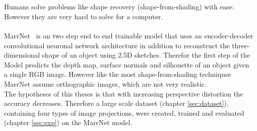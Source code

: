 	\\
	\\
	Humans solve problems like shape recovery (shape-from-shading) with ease. However they are very hard to solve for a computer.	
	\\ 
	\\	
	MarrNet~\cite{MarrNet} is an two step end to end trainable model that uses an encoder-decoder convolutional neuronal network architecture in addition to reconstruct the three-dimensional shape of an object using 2.5D sketches. Therefor the first step of the Model predicts the depth map, surface normals and silhouette of an object given a single RGB image. However like the most shape-from-shading techniques MarrNet assume orthographic images, which are not very realistic. 
	\\
	The hypotheses of this theses is that with increasing perspective distortion the accuracy decreases. Therefore a large scale dataset (chapter \ref{sec:dataset}), containing four types of image projections, were created, trained and evaluated (chapter \ref{sec:exp}) on the MarrNet model.
